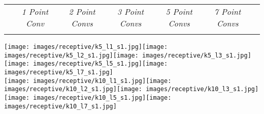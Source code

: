 \documentclass[letterpaper, 10 pt, conference]{ieeeconf}
\begin{document}
\begin{figure*}
\center
\small
\begin{tabular}{ccccccc}
	 &\textit{1 Point Conv} & \textit{2 Point Convs} & \textit{3 Point Convs} & \textit{5 Point Convs} & \textit{7 Point Convs}\\
	\vspace{-0.25cm}
	&\hspace{0.17\textwidth} & \hspace{0.17\textwidth} & \hspace{0.17\textwidth} & \hspace{0.17\textwidth} & \hspace{0.17\textwidth} 
\end{tabular}
	
\texttt{[image: images/receptive/k5\_l1\_s1.jpg]}\hspace{2px}\texttt{[image: images/receptive/k5\_l2\_s1.jpg]}\hspace{2px}\texttt{[image: images/receptive/k5\_l3\_s1.jpg]}\hspace{2px}\texttt{[image: images/receptive/k5\_l5\_s1.jpg]}\hspace{2px}\texttt{[image: images/receptive/k5\_l7\_s1.jpg]}\\
\vspace{2px}
\texttt{[image: images/receptive/k10\_l1\_s1.jpg]}\hspace{2px}\texttt{[image: images/receptive/k10\_l2\_s1.jpg]}\hspace{2px}\texttt{[image: images/receptive/k10\_l3\_s1.jpg]}\hspace{2px}\texttt{[image: images/receptive/k10\_l5\_s1.jpg]}\hspace{2px}\texttt{[image: images/receptive/k10\_l7\_s1.jpg]}\\
\vspace{2px}

\end{figure*}
\end{document}
